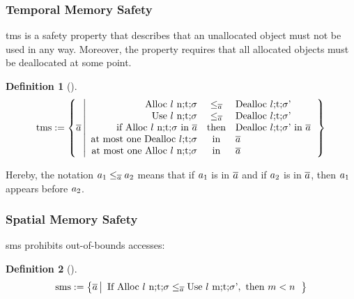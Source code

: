 \documentclass[dvipsnames,conference]{IEEEtran}
\theoremstyle{definition}
\newtheorem{definition}{Definition}[section]
\begin{document}
\subsubsection{Temporal Memory Safety}

\gls*{tms} is a safety property that describes that an unallocated object must not be used in any way.
Moreover, the property requires that all allocated objects must be deallocated at some point.

\begin{definition}[]\label{def:trace:tmsdef}
  \footnotesize$$
  \tmssafe:=\left\{\trace \left| \begin{array}{rcl}
                              \ev{Alloc\ \loc\ n;\sandboxtag;\securitytag}&\le_{\trace}&\ev{Dealloc\ \loc;\sandboxtag;\securitytag'} \\
                              \ev{Use\ \loc\ n;\sandboxtag;\securitytag}&\le_{\trace}&\ev{Dealloc\ \loc;\sandboxtag;\securitytag'} \\
                              \text{if }\ev{Alloc\ \loc\ n;\sandboxtag;\securitytag}\text{ in }\trace&\text{then}&\ev{Dealloc\ \loc;\sandboxtag;\securitytag'}\text{ in }\trace \\
                              \text{at most one }\ev{Dealloc\ \loc;\sandboxtag;\securitytag}&\text{in}&\trace \\
                              \text{at most one }\ev{Alloc\ \loc\ n;\sandboxtag;\securitytag}&\text{in}&\trace \\
                            \end{array}\right.\right\}
  $$
\end{definition}
Hereby, the notation $\event[_{1}]\le_{\trace}\event[_{2}]$ means that if $\event[_{1}]$ is in $\trace$ and if $\event[_{2}]$ is in $\trace$, then $\event[_{1}]$ appears before $\event[_{2}]$.

\subsubsection{Spatial Memory Safety}

\gls*{sms} prohibits out-of-bounds accesses:

\begin{definition}[]\label{def:trace:smsdef}
  $$
  \smssafe:=\left\{\trace \left|\begin{array}{rcl}
                                  \text{If }\ev{Alloc\ \loc\ n;\sandboxtag;\securitytag}\le_{\trace}\ev{Use\ \loc\ m;\sandboxtag;\securitytag'}, \text{ then }m<n
                                \end{array}\right.\right\}
  $$
\end{definition}
\end{document}
